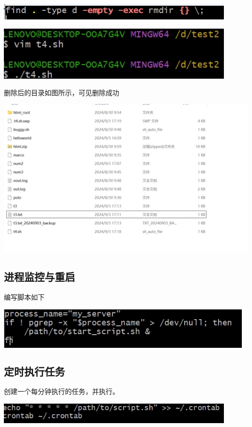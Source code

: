 \documentclass[UTF8,a4paper]{ctexart}
\begin{document}
\begin{sloppypar}
	\includegraphics[width = 12cm]{26}
	
	\includegraphics[width = 12cm]{27}
	
	删除后的目录如图所示，可见删除成功
	
	\includegraphics[width = 16cm]{28}
	
	\subsection{进程监控与重启}
	编写脚本如下
	
	\includegraphics[width = 13cm]{29}
	
	\subsection{定时执行任务}
	创建一个每分钟执行的任务，并执行。
	
	\includegraphics[width = 12cm]{30}
	

\end{sloppypar}
\end{document}
